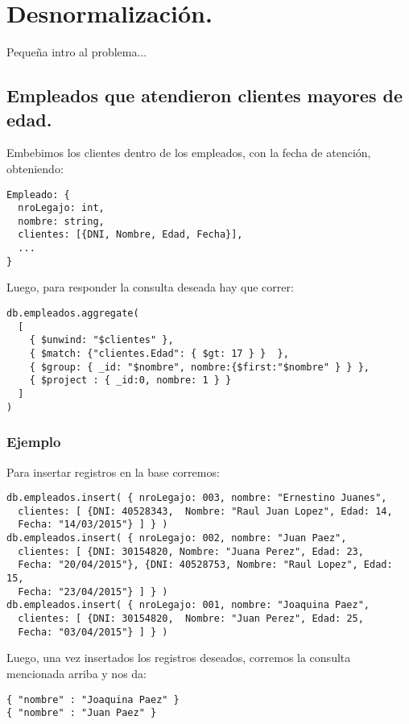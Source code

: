 \section{Desnormalización.}
Pequeña intro al problema...

\subsection{Empleados que atendieron clientes mayores de edad.}

Embebimos los clientes dentro de los empleados, con la fecha de atención, obteniendo:

\begin{lstlisting}
Empleado: {
  nroLegajo: int,
  nombre: string,
  clientes: [{DNI, Nombre, Edad, Fecha}],
  ...
}
\end{lstlisting}

Luego, para responder la consulta deseada hay que correr:

\begin{lstlisting}
db.empleados.aggregate(
  [
    { $unwind: "$clientes" },
    { $match: {"clientes.Edad": { $gt: 17 } }  },
    { $group: { _id: "$nombre", nombre:{$first:"$nombre" } } },
    { $project : { _id:0, nombre: 1 } }
  ]
)
\end{lstlisting}
\label{consulta-a}

\subsubsection{Ejemplo}

Para insertar registros en la base corremos:

\begin{lstlisting}
db.empleados.insert( { nroLegajo: 003, nombre: "Ernestino Juanes",
  clientes: [ {DNI: 40528343,  Nombre: "Raul Juan Lopez", Edad: 14,
  Fecha: "14/03/2015"} ] } )
db.empleados.insert( { nroLegajo: 002, nombre: "Juan Paez",
  clientes: [ {DNI: 30154820, Nombre: "Juana Perez", Edad: 23,
  Fecha: "20/04/2015"}, {DNI: 40528753, Nombre: "Raul Lopez", Edad: 15,
  Fecha: "23/04/2015"} ] } )
db.empleados.insert( { nroLegajo: 001, nombre: "Joaquina Paez",
  clientes: [ {DNI: 30154820,  Nombre: "Juan Perez", Edad: 25,
  Fecha: "03/04/2015"} ] } )
\end{lstlisting}

Luego, una vez insertados los registros deseados, corremos la consulta mencionada arriba y nos da:

\begin{lstlisting}
{ "nombre" : "Joaquina Paez" }
{ "nombre" : "Juan Paez" }
\end{lstlisting}

